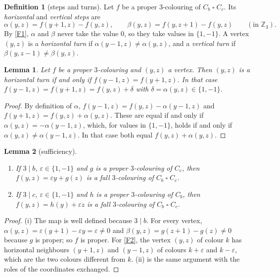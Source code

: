 \documentclass[11pt]{article}
\theoremstyle{plain}
\newtheorem{lemma}[lemma]{Lemma}
\theoremstyle{definition}
\newtheorem{definition}[definition]{Definition}
\theoremstyle{remark}
\newcommand{\Z}{\mathbb{Z}}
\newcommand{\T}{\mathbin{\square}}
\begin{document}
\begin{definition}[steps and turns]\label{def:turns}
Let $f$ be a proper $3$-colouring of $C_b \T C_c$. Its \emph{horizontal} and \emph{vertical
steps} are
\[
\alpha(y,z) = f(y+1, z) - f(y,z), \qquad \beta(y,z) = f(y, z+1) - f(y,z) \qquad (\text{in }
\Z_3).
\]
By \ref{F1}, $\alpha$ and $\beta$ never take the value $0$, so they take values in
$\{1, -1\}$. A vertex $(y,z)$ is a \emph{horizontal turn} if $\alpha(y-1,z) \ne \alpha(y,z)$,
and a \emph{vertical turn} if $\beta(y, z-1) \ne \beta(y, z)$.
\end{definition}

\begin{lemma}\label{lem:turn-colours}
Let $f$ be a proper $3$-colouring and $(y,z)$ a vertex. Then $(y,z)$ is a horizontal turn if
and only if $f(y-1,z) = f(y+1,z)$. In that case $f(y-1,z) = f(y+1,z) = f(y,z) + \delta$ with
$\delta = \alpha(y,z) \in \{1,-1\}$.
\end{lemma}

\begin{proof}
By definition of $\alpha$, $f(y-1,z) = f(y,z) - \alpha(y-1,z)$ and
$f(y+1,z) = f(y,z) + \alpha(y,z)$. These are equal if and only if
$\alpha(y,z) = -\alpha(y-1,z)$, which, for values in $\{1,-1\}$, holds if and only if
$\alpha(y,z) \ne \alpha(y-1,z)$. In that case both equal $f(y,z) + \alpha(y,z)$.
\end{proof}

\begin{lemma}[sufficiency]\label{lem:fall-sufficient}
\begin{enumerate}[label=(\roman*)]
  \item If $3 \mid b$, $\varepsilon \in \{1,-1\}$ and $g$ is a proper $3$-colouring of $C_c$,
        then $f(y,z) = \varepsilon y + g(z)$ is a fall $3$-colouring of $C_b \T C_c$.
  \item If $3 \mid c$, $\varepsilon \in \{1,-1\}$ and $h$ is a proper $3$-colouring of $C_b$,
        then $f(y,z) = h(y) + \varepsilon z$ is a fall $3$-colouring of $C_b \T C_c$.
\end{enumerate}
\end{lemma}

\begin{proof}
(i) The map is well defined because $3 \mid b$. For every vertex, $\alpha(y,z) =
\varepsilon(y+1) - \varepsilon y = \varepsilon \ne 0$ and $\beta(y,z) = g(z+1) - g(z) \ne 0$
because $g$ is proper; so $f$ is proper. For \ref{F2}, the vertex $(y,z)$ of colour $k$ has
horizontal neighbours $(y+1, z)$ and $(y-1, z)$ of colours $k + \varepsilon$ and
$k - \varepsilon$, which are the two colours different from $k$. (ii) is the same argument
with the roles of the coordinates exchanged.
\end{proof}
\end{document}
